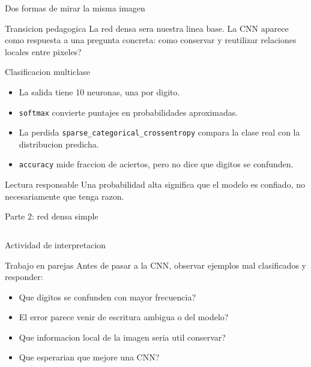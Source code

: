 \begin{frame}{Dos formas de mirar la misma imagen}
\centering
\resizebox{0.96\linewidth}{!}{}
\vspace{0.2cm}
\begin{block}{Transicion pedagogica}
La red densa sera nuestra linea base. La CNN aparece como respuesta a una pregunta concreta: como conservar y reutilizar relaciones locales entre pixeles?
\end{block}
\end{frame}

\begin{frame}{Clasificacion multiclase}
\begin{itemize}
    \item La salida tiene 10 neuronas, una por digito.
    \item \texttt{softmax} convierte puntajes en probabilidades aproximadas.
    \item La perdida \texttt{sparse\_categorical\_crossentropy} compara la clase real con la distribucion predicha.
    \item \texttt{accuracy} mide fraccion de aciertos, pero no dice que digitos se confunden.
\end{itemize}
\begin{alertblock}{Lectura responsable}
Una probabilidad alta significa que el modelo es confiado, no necesariamente que tenga razon.
\end{alertblock}
\end{frame}

\begin{frame}[fragile]{Parte 2: red densa simple}
\inputminted{python}{codes/clase1-p2.py}
\end{frame}

\begin{frame}{Actividad de interpretacion}
\begin{block}{Trabajo en parejas}
Antes de pasar a la CNN, observar ejemplos mal clasificados y responder:
\end{block}
\begin{itemize}
    \item Que digitos se confunden con mayor frecuencia?
    \item El error parece venir de escritura ambigua o del modelo?
    \item Que informacion local de la imagen seria util conservar?
    \item Que esperarian que mejore una CNN?
\end{itemize}
\end{frame}

